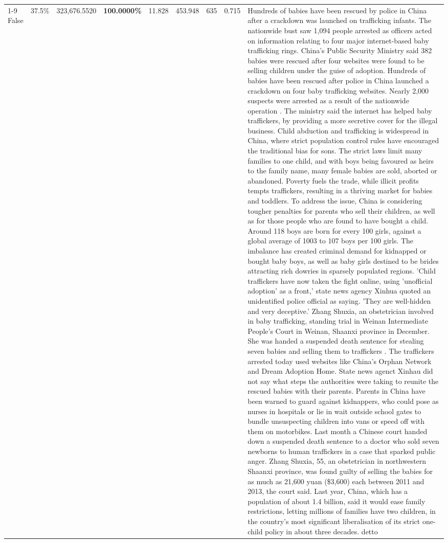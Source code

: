 \begin{table}[H]
\begin{tabular}{lllrlllll}
\cline{1-9}
False & 37.5\% & 323,676.5520 & \bfseries \color{red} 100.0000\% & 11.828 & 453.948 & 635 & 0.715 & Hundreds of babies have been rescued by police in China after a crackdown was launched on trafficking infants. The nationwide bust saw 1,094 people arrested as officers acted on information relating to four major internet-based baby trafficking rings. China's Public Security Ministry said 382 babies were rescued after four websites were found to be selling children under the guise of adoption. Hundreds of babies have been rescued after police in China launched a crackdown on four baby trafficking websites. Nearly 2,000 suspects were arrested as a result of the nationwide operation . The ministry said the internet has helped baby traffickers, by providing a more secretive cover for the illegal business. Child abduction and trafficking is widespread in China, where strict population control rules have encouraged the traditional bias for sons. The strict laws limit many families to one child, and with boys being favoured as heirs to the family name, many female babies are sold, aborted or abandoned. Poverty fuels the trade, while illicit profits tempts traffickers, resulting in a thriving market for babies and toddlers. To address the issue, China is considering tougher penalties for parents who sell their children, as well as for those people who are found to have bought a child. Around 118 boys are born for every 100 girls, against a global average of 1003 to 107 boys per 100 girls. The imbalance has created criminal demand for kidnapped or bought baby boys, as well as baby girls destined to be brides attracting rich dowries in sparsely populated regions. 'Child traffickers have now taken the fight online, using 'unofficial adoption' as a front,' state news agency Xinhua quoted an unidentified police official as saying. 'They are well-hidden and very deceptive.' Zhang Shuxia, an obstetrician involved in baby trafficking, standing trial in Weinan Intermediate People's Court in Weinan, Shaanxi province in December. She was handed a suspended death sentence for stealing seven babies and selling them to traffickers . The traffickers arrested today used websites like China's Orphan Network and Dream Adoption Home. State news agenct Xinhau did not say what steps the authorities were taking to reunite the rescued babies with their parents. Parents in China have been warned to guard against kidnappers, who could pose as nurses in hospitals or lie in wait outside school gates to bundle unsuspecting children into vans or speed off with them on motorbikes. Last month a Chinese court handed down a suspended death sentence to a doctor who sold seven newborns to human traffickers in a case that sparked public anger. Zhang Shuxia, 55, an obstetrician in northwestern Shaanxi province, was found guilty of selling the babies for as much as 21,600 yuan (\$3,600) each between 2011 and 2013, the court said. Last year, China, which has a population of about 1.4 billion, said it would ease family restrictions, letting millions of families have two children, in the country's most significant liberalisation of its strict one-child policy in about three decades. detto \\

\end{tabular}
\end{table}
